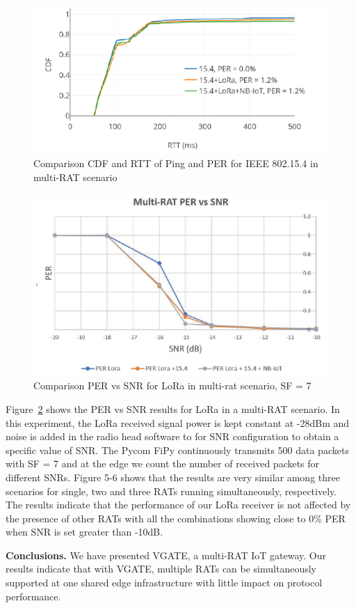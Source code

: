 \documentclass[10pt,emptycopyrightspace]{ewsn-proc}
\newcommand{\fakepar}[1]{\noindent\textbf{#1.}}
\begin{document}
\begin{figure}[h]
  \centering
	\includegraphics[width= 0.4 \textwidth]{5-5.png}
	\caption{Comparison CDF and RTT of Ping and PER for IEEE
802.15.4 in multi-RAT scenario}
	\label{fig:5-5}
\end{figure}


\begin{figure}[h]
  \vspace{-0.3cm}
	\centering
	\includegraphics[width= 0.4 \textwidth]{5-6.png}
	\caption{Comparison PER vs SNR for LoRa in multi-rat scenario, SF = 7
}
	\label{fig:5-6}
\end{figure}


Figure~\ref{fig:5-6} shows the PER vs SNR results for LoRa in a
multi-RAT scenario. In this experiment, the LoRa received signal power
is kept constant at -28dBm and noise is added in the radio head
software to for SNR configuration to obtain a specific value of
SNR. The Pycom FiPy continuously transmits 500 data packets with SF =
7 and at the edge we count the number of received packets for
different SNRs. Figure 5-6 shows that the results are very similar
among three scenarios for single, two and three RATs running
simultaneously, respectively. The results indicate that the performance of our
LoRa receiver is not affected by the presence of other RATs with all
the combinations showing close to 0\% PER when SNR is set greater than
-10dB.

\fakepar{Conclusions} We have presented VGATE, a multi-RAT IoT gateway.
Our results indicate that with VGATE, multiple RATs can be
simultaneously supported at one shared edge infrastructure
with little impact on protocol performance.


\end{document}
